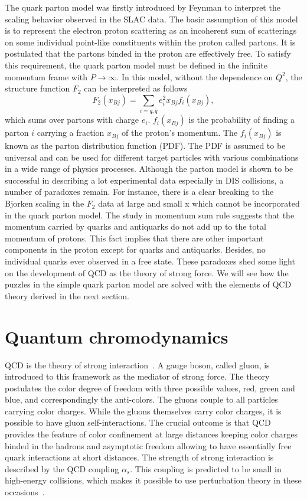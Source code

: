 The quark parton model was firstly introduced by Feynman to interpret the
scaling behavior observed in the SLAC data. The basic assumption of this model
is to represent the electron proton scattering as an incoherent sum of
scatterings on some individual point-like constituents within the proton called
partons. It is postulated that the partons binded in the proton are effectively
free. To satisfy this requirement, the quark parton model must be defined in the
infinite momentum frame with $P\rightarrow\infty$. In this model, without the
dependence on $Q^{2}$, the structure function $F_{2}$ can be interpreted as
follows
\begin{equation}
F_{2}(x_{Bj})=\sum_{i=q,\bar{q}}e^{2}_{i}x_{Bj}f_{i}(x_{Bj}),
\label{eqn:F2_QPM}
\end{equation}
which sums over partons with charge $e_{i}$. $f_{i}(x_{Bj})$ is the probability
of finding a parton $i$ carrying a fraction $x_{Bj}$ of the proton's momentum.
The $f_{i}(x_{Bj})$ is known as the parton distribution function (PDF). The PDF
is assumed to be universal and can be used for different target particles with
various combinations in a wide range of physics processes. Although the parton
model is shown to be successful in describing a lot experimental data especially
in DIS collisions, a number of paradoxes remain. For instance, there is a clear
breaking to the Bjorken scaling in the $F_{2}$ data at large and small x which
cannot be incorporated in the quark parton model. The study in momentum sum rule
suggests that the momentum carried by quarks and antiquarks do not add up to the
total momentum of protons. This fact implies that there are other important
components in the proton except for quarks and antiquarks. Besides, no
individual quarks ever observed in a free state. These paradoxes shed some light
on the development of QCD as the theory of strong force. We will see how the
puzzles in the simple quark parton model are solved with the elements of QCD
theory derived in the next section.




\section{Quantum chromodynamics} \label{sec:QCD}
QCD is the theory of strong interaction~\cite{Politzer:1974fr}. A gauge
boson, called gluon, is introduced to this framework as the mediator of strong
force. The theory postulates the color degree of freedom with three possible
values, red, green and blue, and correspondingly the anti-colors. The gluons
couple to all particles carrying color charges. While the gluons themselves
carry color charges, it is possible to have gluon self-interactions. The crucial
outcome is that QCD provides the feature of color confinement at large distances
keeping color charges binded in the hadrons and asymptotic freedom allowing to
have essentially free quark interactions at short distances. The strength of
strong interaction is described by the QCD coupling $\alpha_{s}$. This coupling
is predicted to be small in high-energy collisions, which makes it possible to
use perturbation theory in these occasions~\cite{Lipatov:1974qm}.


